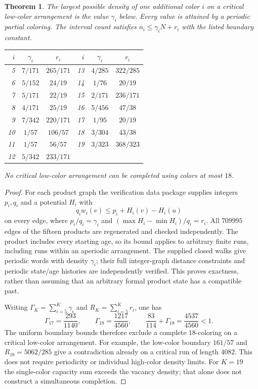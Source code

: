 \documentclass[11pt,reqno]{amsart}
\theoremstyle{plain}
\newtheorem{theorem}{Theorem}
\theoremstyle{plain}
\theoremstyle{plain}
\begin{document}
\begin{theorem}\label{M-thm:critical-capacities}
The largest possible density of one additional color $i$ on a critical
low-color arrangement is the value $\gamma_i$ below. Every value is attained
by a periodic partial coloring. The interval count satisfies
$n_i\le\gamma_i N+r_i$ with the listed boundary constant.
\begin{center}
\begin{tabular}{rccrcc}
\toprule
$i$&$\gamma_i$&$r_i$&$i$&$\gamma_i$&$r_i$\\\midrule
5&$7/171$&$265/171$&13&$4/285$&$322/285$\\
6&$5/152$&$24/19$&14&$1/76$&$20/19$\\
7&$5/171$&$22/19$&15&$2/171$&$236/171$\\
8&$4/171$&$25/19$&16&$5/456$&$47/38$\\
9&$7/342$&$220/171$&17&$1/95$&$20/19$\\
10&$1/57$&$106/57$&18&$3/304$&$43/38$\\
11&$1/57$&$56/57$&19&$3/323$&$368/323$\\
12&$5/342$&$233/171$&&&\\\bottomrule
\end{tabular}
\end{center}
No critical low-color arrangement can be completed using colors at most $18$.
\end{theorem}
\begin{proof}
For each product graph the verification data package supplies integers $p_i,q_i$ and
a potential $H_i$ with
\[
 q_i w_i(e)\le p_i+H_i(v)-H_i(u)
\]
on every edge, where $p_i/q_i=\gamma_i$ and
$(\max H_i-\min H_i)/q_i=r_i$.
All $709995$ edges of the fifteen products are regenerated and checked
independently. The product includes every starting age, so its bound applies
to arbitrary finite runs, including runs within an aperiodic arrangement.
The supplied closed walks give periodic words with density $\gamma_i$;
their full integer-graph distance constraints and periodic state/age histories
are independently verified. This proves exactness, rather than assuming
that an arbitrary formal product state has a compatible past.

Writing $\Gamma_K=\sum_{i=5}^K\gamma_i$ and
$R_K=\sum_{i=5}^Kr_i$, one has
\[
 \Gamma_{17}=\frac{293}{1140},\qquad
 \Gamma_{18}=\frac{1217}{4560},\qquad
 \frac{83}{114}+\Gamma_{18}=\frac{4537}{4560}<1.
\]
The uniform boundary bounds therefore exclude a complete $18$-coloring
on a critical low-color arrangement. For example, the low-color boundary
$161/57$ and $R_{18}=5062/285$ give a contradiction already on a critical
run of length $4082$. This does not require periodicity or individual
high-color density limits. For $K=19$ the single-color capacity sum exceeds
the vacancy density; that alone does not construct a simultaneous completion.
\end{proof}
\end{document}
